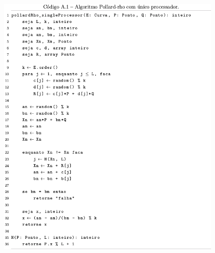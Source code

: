 \documentclass{beamer}
\begin{document}
\begin{frame}
  \begin{figure}[h]
    \centering
    \includegraphics[scale=0.22]{unico_processador}
  \end{figure}
\end{frame}

%
%

\end{document}
